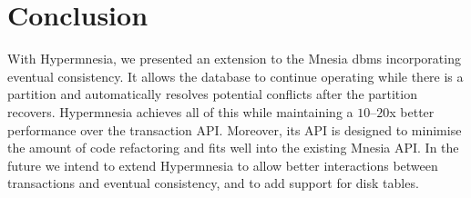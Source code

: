 \section{Conclusion} \label{sec:concl}


With Hypermnesia, we presented an extension to the Mnesia \acrshort{dbms}
incorporating eventual consistency. 
It allows the database to continue operating while there is a partition and 
automatically resolves potential conflicts after the partition recovers.
Hypermnesia achieves all of this while maintaining a \(10\)--\(20\)x better performance 
over the transaction API. Moreover, its API is designed to minimise the amount of 
code refactoring and fits well into the existing Mnesia API.
In the future we intend to extend Hypermnesia to allow better interactions between
transactions and eventual consistency, and to add support for disk tables.



